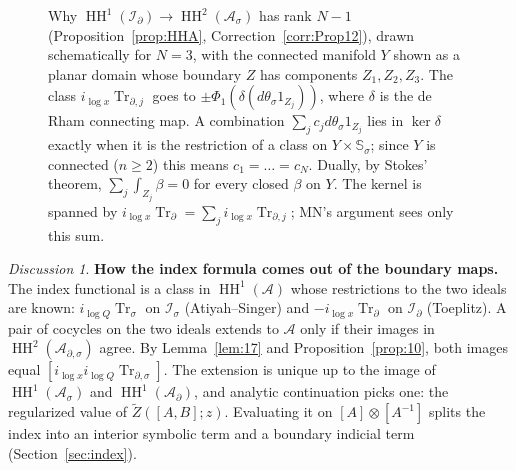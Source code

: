 \documentclass[11pt,oneside,reqno]{article}
\DeclareMathOperator{\HH}{HH}
\DeclareMathOperator{\Tr}{Tr}
\newcommand{\C}{\mathbb C}
\newcommand{\cA}{\mathcal A}
\newcommand{\Is}{\mathcal I_\sigma}
\newcommand{\Id}{\mathcal I_\partial}
\newcommand{\As}{\mathcal A_\sigma}
\newcommand{\Ad}{\mathcal A_\partial}
\newcommand{\Ads}{\mathcal A_{\partial,\sigma}}
\newcommand{\Trs}{\Tr_\sigma}
\newcommand{\Trd}{\Tr_\partial}
\newcommand{\Trds}{\Tr_{\partial,\sigma}}
\newcommand{\Ssig}{\mathbb S_\sigma}
\newcommand{\Hrel}{H_{\mathrm{rel}}}
\newcommand{\lQ}{\log Q}
\newcommand{\lx}{\log x}
\theoremstyle{plain}
\theoremstyle{definition}
\theoremstyle{remark}
\newtheorem*{discussion}{Discussion}
\begin{document}
\begin{figure}[htbp]
\centering
{}
\caption[The rank \(N-1\) phenomenon]{Why \(\HH^1(\Id)\to\HH^2(\As)\)
has rank \(N-1\) (Proposition~\ref{prop:HHA}, Correction~\ref{corr:Prop12}),
drawn schematically for \(N=3\), with the connected manifold \(Y\) shown as a
planar domain whose boundary \(Z\) has components \(Z_1,Z_2,Z_3\). The class
\(i_{\lx}\Tr_{\partial,j}\) goes to \(\pm\Phi_1(\delta(d\theta_\sigma1_{Z_j}))\),
where \(\delta\) is the de Rham connecting map. A combination
\(\sum_jc_jd\theta_\sigma1_{Z_j}\) lies in \(\ker\delta\) exactly when it
is the restriction of a class on \(Y\times\Ssig\); since \(Y\) is connected
(\(n\ge2\)) this means \(c_1=\dots=c_N\). Dually, by Stokes' theorem,
\(\sum_j\int_{Z_j}\beta=0\) for every closed \(\beta\) on \(Y\). The
kernel is spanned by \(i_{\lx}\Trd=\sum_ji_{\lx}\Tr_{\partial,j}\); MN's
argument sees only this sum.}
\label{fig:rank}
\end{figure}

\begin{discussion}
\textbf{How the index formula comes out of the boundary maps.} The index
functional is a class in \(\HH^1(\cA)\) whose restrictions to the two
ideals are known: \(i_{\lQ}\Trs\) on \(\Is\) (Atiyah--Singer) and
\(-i_{\lx}\Trd\) on \(\Id\) (Toeplitz). A pair of cocycles on the two
ideals extends to \(\cA\) only if their images in \(\HH^2(\Ads)\) agree.
By Lemma~\ref{lem:17} and Proposition~\ref{prop:10}, both images equal
\([i_{\lx}i_{\lQ}\Trds]\). The extension is unique up to the image of
\(\HH^1(\As)\) and \(\HH^1(\Ad)\), and analytic continuation picks one:
the regularized value of \(\widetilde Z([A,B];z)\). Evaluating it on
\([A]\otimes[A^{-1}]\) splits the index into an interior symbolic term
and a boundary indicial term (Section~\ref{sec:index}).
\end{discussion}
\end{document}
